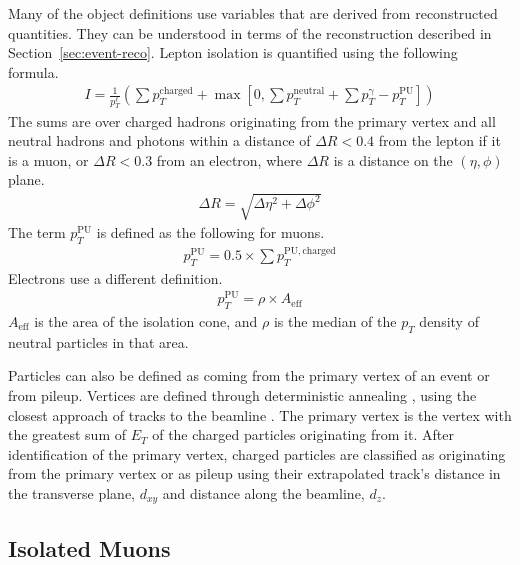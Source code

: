 Many of the object definitions use variables that are derived from reconstructed quantities.
They can be understood in terms of the reconstruction
described in Section~\ref{sec:event-reco}.
Lepton isolation is quantified using the following formula.
\begin{gather}
  I = \frac{1}{p_T^\ell} \left(\sum p_T^\mathrm{charged} +
      \max\left[0, \sum p_T^\mathrm{neutral} +
               \sum p_T^\mathrm{\gamma} - p_T^\mathrm{PU}
               \right]\right) \label{eq:isolation}
\end{gather}
The sums are over charged hadrons originating from the primary vertex
and all neutral hadrons and photons within a distance of $\Delta R < 0.4$
from the lepton if it is a muon, or $\Delta R < 0.3$ from an electron,
where $\Delta R$ is a distance on the $(\eta, \phi)$ plane.
\begin{gather}
  \Delta R = \sqrt{\Delta\eta^2 + \Delta\phi^2}
\end{gather}
The term $p_T^\mathrm{PU}$ is defined as the following for muons.
\begin{gather}
  p_T^\mathrm{PU} = 0.5 \times \sum p_T^{\mathrm{PU}, \mathrm{charged}}
\end{gather}
Electrons use a different definition.
\begin{gather}
  p_T^\mathrm{PU} = \rho \times A_\mathrm{eff}
\end{gather}
$A_\mathrm{eff}$ is the area of the isolation cone,
and $\rho$ is the median of the $p_T$ density of neutral particles in that area.

Particles can also be defined as coming from the primary vertex of an event or from pileup.
Vertices are defined through deterministic annealing \cite{726788},
using the closest approach of tracks to the beamline \cite{Collaboration_2014}.
The primary vertex is the vertex with
the greatest sum of $E_T$ of the charged particles originating from it.
After identification of the primary vertex,
charged particles are classified as originating from the primary vertex or as pileup
using their extrapolated track's distance in the transverse plane, $d_{xy}$
and distance along the beamline, $d_z$.

\subsection{Isolated Muons} \label{sec:muon-def}

